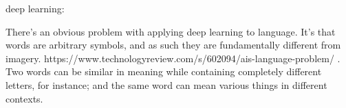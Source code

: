 %
%




\clearpage


deep learning:

There’s an obvious problem with applying deep learning to language. It’s that words are arbitrary symbols, and as such they are fundamentally different from imagery.
https://www.technologyreview.com/s/602094/ais-language-problem/
. Two words can be similar in meaning while containing completely different letters, for instance; and the same word can mean various things in different contexts.






